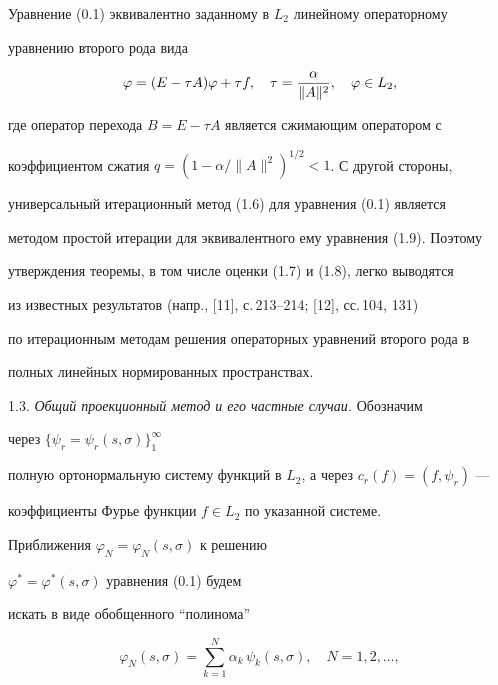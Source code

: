 \begin{pf}


Уравнение (0.1) эквивалентно заданному в $L_2$  линейному операторному 


уравнению второго рода вида


\begin{equation}


\vp = (E-\tau A)\vp + \tau f,\quad


\tau = \frac{\alpha}{\|A\|^2},\quad \vp \in L_2,


\end{equation}


где оператор перехода $B = E-\tau A$ является сжимающим оператором с 


коэффициентом сжатия $q = (1-\alpha/\|A\|^2)^{1/2}<1$. С другой стороны, 


универсальный итерационный метод (1.6) для уравнения (0.1) является 


методом простой итерации для эквивалентного ему уравнения (1.9). Поэтому 


утверждения теоремы, в том числе оценки (1.7) и (1.8), легко выводятся 


из известных результатов (напр., [11], с.\,213--214; [12], сс.\,104, 131) 


по итерационным методам решения операторных уравнений второго рода в 


полных линейных нормированных пространствах. 


\end{pf}





1.3. {\it Общий проекционный метод и его частные случаи.} Обозначим 


через $\{\psi_r=\psi_r(s,\sigma )\}_1^\infty$


полную ортонормальную систему функций в $L_2$, а через $c_r(f)=(f,\psi_r)$ ---


коэффициенты Фурье функции $f\in L_2$ по указанной системе.


Приближения $\varphi_N =\varphi_N (s,\sigma )$ к решению


$\varphi^\ast =\varphi^\ast (s,\sigma )$ уравнения (0.1) будем


искать в виде обобщенного ``полинома''


\begin{equation}


\varphi_N (s,\sigma )=\sum_{k=1}^N \alpha _k\, \psi_k(s,\sigma ),


\quad N=1,2,\dotsc,


\end{equation}


